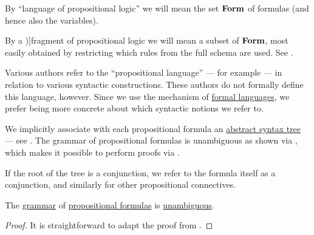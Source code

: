 \begin{definition}
\begin{thmenum}
     By \enquote{language of propositional logic} we will mean the set \( \op*{Form} \) of formulas (and hence also the variables).

     By a \term[en=fragment (\cite[49]{Mimram2020})]{fragment} of propositional logic we will mean a subset of \( \op*{Form} \), most easily obtained by restricting which rules from the full schema are used. See .
  \end{thmenum}
\end{definition}
\begin{comments}
  \item Various authors refer to the \enquote{propositional language} --- for example  --- in relation to various syntactic constructions. These authors do not formally define this language, however. Since we use the mechanism of \hyperref[def:formal_language]{formal languages}, we prefer being more concrete about which syntactic notions we refer to.

  \item We implicitly associate with each propositional formula an \hyperref[con:abstract_syntax_tree]{abstract syntax tree} --- see . The grammar of propositional formulas is unambiguous as shown via , which makes it possible to perform proofs via .

  \item If the root of the tree is a conjunction, we refer to the formula itself as a conjunction, and similarly for other propositional connectives.
\end{comments}

\begin{proposition}\label{thm:propositional_formulas_are_unambiguous}
  The \hyperref[def:formal_grammar]{grammar} of \hyperref[def:propositional_syntax/formula]{propositional formulas} is \hyperref[def:grammar_ambiguity]{unambiguous}.
\end{proposition}
\begin{proof}
  It is straightforward to adapt the proof from .
\end{proof}

